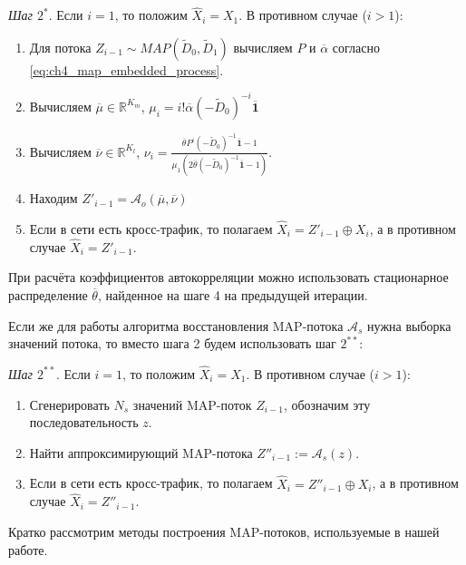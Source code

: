\textit{Шаг $2^*$}. Если $i = 1$, то положим $\hat{X}_i = X_1$. В противном случае ($i > 1$):
\begin{enumerate}
\item Для потока $Z_{i-1} \sim MAP(\tilde{D}_0, \tilde{D}_1)$ вычисляем $P$ и $\overline\alpha$ согласно \eqref{eq:ch4_map_embedded_process}.
\item Вычисляем $\overline\mu \in \mathbb{R}^{K_m}$, $\mu_i = i! \overline\alpha (-\tilde{D}_0)^{-i} \overline{\mathbf{1}}$
\item Вычисляем $\overline\nu \in \mathbb{R}^{K_l}$, $\nu_i = \frac{\overline\theta P^i (-\tilde{D}_0)^{-1} \overline{\mathbf{1}} - 1}{\mu_1 \left( 2 \overline\theta (-\tilde{D}_0)^{-1} \overline{\mathbf{1}} - 1 \right)}$.
\item Находим $Z'_{i-1} = \mathcal{A}_o(\overline\mu, \overline\nu)$
\item Если в сети есть кросс-трафик, то полагаем $\hat{X}_i = Z'_{i-1} \oplus X_i$, а в противном случае $\hat{X}_i = Z'_{i-1}$.
\end{enumerate}
При расчёта коэффициентов автокорреляции можно использовать стационарное распределение $\overline\theta$, найденное на шаге 4 на предыдущей итерации.

Если же для работы алгоритма восстановления MAP-потока $\mathcal{A}_s$ нужна выборка значений потока, то вместо шага 2 будем использовать шаг $2^{**}$:

\textit{Шаг $2^{**}$}. Если $i = 1$, то положим $\hat{X}_i = X_1$. В противном случае ($i > 1$):
\begin{enumerate}
\item Сгенерировать $N_s$ значений MAP-поток $Z_{i-1}$, обозначим эту последовательность $z$.
\item Найти аппроксимирующий MAP-потока $Z''_{i-1} := \mathcal{A}_s(z)$.
\item Если в сети есть кросс-трафик, то полагаем $\hat{X}_i = Z''_{i-1} \oplus X_i$, а в противном случае $\hat{X}_i = Z''_{i-1}$.
\end{enumerate}

Кратко рассмотрим методы построения MAP-потоков, используемые в нашей работе.


